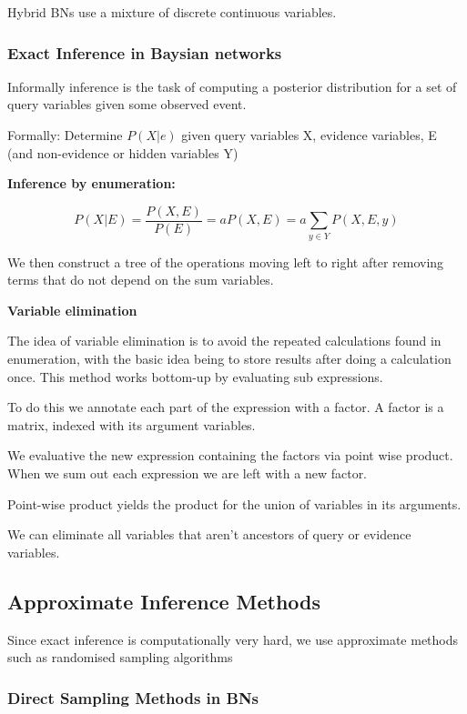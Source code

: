 \documentclass{article}
\begin{document}
Hybrid BNs use a mixture of discrete continuous variables.

\subsubsection{Exact Inference in Baysian networks}

Informally inference is the task of computing a posterior distribution for a set of query variables given some observed event. \newline

Formally: Determine $P(X|e)$ given query variables X, evidence variables, E (and non-evidence or hidden variables Y) \newline

\textbf{Inference by enumeration:}

$$P(X | E) = \frac{P(X, E)}{P(E)} = a P (X, E) = a \sum_{y \in Y} P(X, E, y)$$ 

We then construct a tree of the operations moving left to right after removing terms that do not depend on the sum variables.

\textbf{Variable elimination}

The idea of variable elimination is to avoid the repeated calculations found in enumeration, with the basic idea being to store results after doing a calculation once. This method works bottom-up by evaluating sub expressions.

To do this we annotate each part of the expression with a factor. A factor is a matrix, indexed with its argument variables.

We evaluative the new expression containing the factors via point wise product. When we sum out each expression we are left with a new factor. 

Point-wise product yields the product for the union of variables in its arguments.

We can eliminate all variables that aren't ancestors of query or evidence variables.

\subsection{Approximate Inference Methods}

Since exact inference is computationally very hard, we use approximate methods such as randomised sampling algorithms

\subsubsection{Direct Sampling Methods in BNs}
\end{document}
